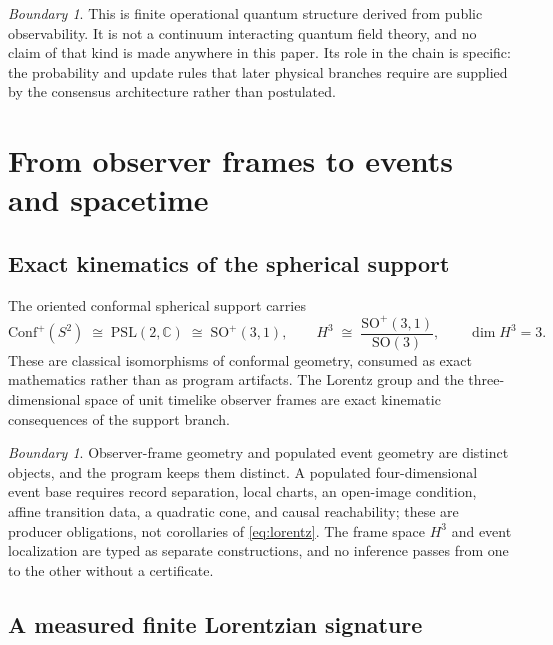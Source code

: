 \documentclass[11pt]{article}
\theoremstyle{remark}
\newtheorem{boundary}[theorem]{Boundary}
\begin{document}
\begin{boundary}
This is finite operational quantum structure derived from public
observability. It is not a continuum interacting quantum field theory, and
no claim of that kind is made anywhere in this paper. Its role in the chain
is specific: the probability and update rules that later physical branches
require are supplied by the consensus architecture rather than postulated.
\end{boundary}

\section{From observer frames to events and spacetime}
\label{sec:spacetime}

\subsection{Exact kinematics of the spherical support}

The oriented conformal spherical support carries
\begin{equation}
\mathrm{Conf}^{+}(S^{2})\;\cong\;\mathrm{PSL}(2,\mathbb C)\;\cong\;
\mathrm{SO}^{+}(3,1),
\qquad
H^{3}\;\cong\;\frac{\mathrm{SO}^{+}(3,1)}{\mathrm{SO}(3)},
\qquad
\dim H^{3}=3 .
\label{eq:lorentz}
\end{equation}
These are classical isomorphisms of conformal geometry, consumed as exact
mathematics rather than as program artifacts. The Lorentz group and the
three-dimensional space of unit timelike observer frames are exact kinematic
consequences of the support branch.

\begin{boundary}
Observer-frame geometry and populated event geometry are distinct objects,
and the program keeps them distinct. A populated four-dimensional event base
requires record separation, local charts, an open-image condition, affine
transition data, a quadratic cone, and causal reachability; these are
producer obligations, not corollaries of \eqref{eq:lorentz}. The frame space
$H^{3}$ and event localization are typed as separate constructions, and no
inference passes from one to the other without a certificate.
\end{boundary}

\subsection{A measured finite Lorentzian signature}
\label{sec:signature}
\end{document}
